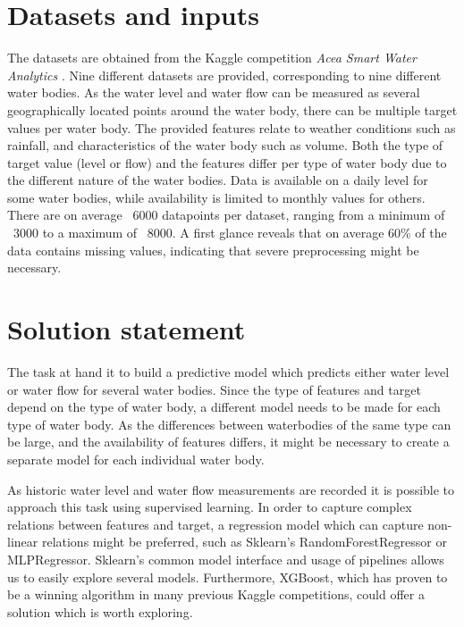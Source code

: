 \documentclass[11pt]{article}
\begin{document}
\section{Datasets and inputs}

The datasets are obtained from the Kaggle competition \emph{Acea Smart Water Analytics} \cite{kaggle}. Nine different datasets are provided, corresponding to nine different water bodies. As the water level and water flow can be measured as several geographically located points around the water body, there can be multiple target values per water body. The provided features relate to weather conditions such as rainfall, and characteristics of the water body such as volume. Both the type of target value (level or flow) and the features differ per type of water body due to the different nature of the water bodies. Data is available on a daily level for some water bodies, while availability is limited to monthly values for others. There are on average ~6000 datapoints per dataset, ranging from a minimum of ~3000 to a maximum of ~8000. A first glance reveals that on average 60\% of the data contains missing values, indicating that severe preprocessing might be necessary.

\section{Solution statement}

The task at hand it to build a predictive model which predicts either water level or water flow for several water bodies. Since the type of features and target depend on the type of water body, a different model needs to be made for each type of water body. As the differences between waterbodies of the same type can be large, and the availability of features differs, it might be necessary to create a separate model for each individual water body. 

As historic water level and water flow measurements are recorded it is possible to approach this task using supervised learning. In order to capture complex relations between features and target, a regression model which can capture non-linear relations might be preferred, such as Sklearn's RandomForestRegressor or MLPRegressor. Sklearn's common model interface and usage of pipelines allows us to easily explore several models. Furthermore, XGBoost, which has proven to be a winning algorithm in many previous Kaggle competitions, could offer a solution which is worth exploring. 
\end{document}
